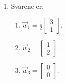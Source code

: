\begin{enumerate}
\begin{enumerate}
		
	\end{enumerate}
	
	\item Svarene er:
	\begin{enumerate}
		\item $\vec{w}_1=\frac{1}{2}\begin{bmatrix}
		3\\1
		\end{bmatrix}.$
		\item $\vec{w}_2=\begin{bmatrix}
		1\\2
		\end{bmatrix}.$
		\item $\vec{w}_3=\begin{bmatrix}
		0\\0
		\end{bmatrix}.$
	\end{enumerate}

%	
%	
\end{enumerate}